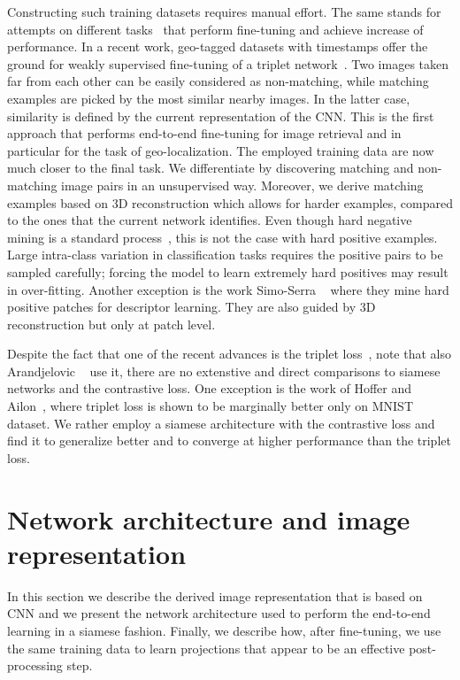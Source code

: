 \documentclass[runningheads]{llncs}
\begin{document}
Constructing such training datasets requires manual effort. 
The same stands for attempts on different tasks~\cite{RASC14,TSJ16} that perform fine-tuning and achieve increase of performance.
In a recent work, geo-tagged datasets with timestamps offer the ground for weakly supervised fine-tuning of a triplet network~\cite{AGTPS15}. 
Two images taken far from each other can be easily considered as non-matching, while matching examples are picked by the most similar nearby images. 
In the latter case, similarity is defined by the current representation of the CNN.
This is the first approach that performs end-to-end fine-tuning for image retrieval and in particular for the task of geo-localization.
The employed training data are now much closer to the final task.
We differentiate by discovering matching and non-matching image pairs in an unsupervised way.
Moreover, we derive matching examples based on 3D reconstruction which allows for harder examples, compared to the ones that the current network identifies. 
Even though hard negative mining is a standard process~\cite{GDDM14,AGTPS15}, this is not the case with hard positive examples. 
Large intra-class variation in classification tasks requires the positive pairs to be sampled carefully;  forcing the model to learn  extremely hard positives may result in over-fitting.
Another exception is the work Simo-Serra \etal~\cite{STFKM14} where they mine hard positive patches for descriptor learning. 
They are also guided by 3D reconstruction but only at patch level.

Despite the fact that one of the recent advances is the triplet loss~\cite{WSLT+14,SKP15,HA15}, note that also Arandjelovic \etal~\cite{AGTPS15} use it, there are no extenstive and direct comparisons to siamese networks and the contrastive loss. 
One exception is the work of Hoffer and Ailon~\cite{HA15}, where triplet loss is shown to be marginally better only on MNIST dataset.
We rather employ a siamese architecture with the contrastive loss and find it to generalize better and to converge at higher performance than the triplet loss. \section{Network architecture and image representation}
\label{sec:network}
In this section we describe the derived image representation that is based on CNN and we present the network architecture used to perform the end-to-end learning in a siamese fashion.
Finally, we describe how, after fine-tuning, we use the same training data to learn projections that appear to be an effective post-processing step.
\end{document}
